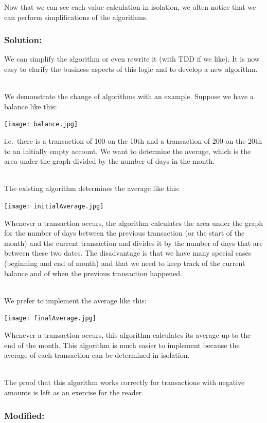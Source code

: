\documentclass[a4paper,fleqn,titlepage,11pt]{article}
\begin{document}
Now that we can see each value calculation in isolation, we often notice that we can perform simplifications of the algorithms. 

\subsubsection*{Solution:}

We can simplify the algorithm or even rewrite it (with TDD if we like). It is now easy to clarify the business aspects of this logic and to develop a new algorithm. 
\\~

We demonstrate the change of algorithms with an example.
Suppose we have a balance like this:

\texttt{[image: balance.jpg]}

i.e.~there is a transaction of 100 on the 10th and a transaction of 200 on the 20th to an initially empty account.
We want to determine the average, which is the area under the graph divided by the number of days in the month.
\\~

The existing algorithm determines the average like this:

\texttt{[image: initialAverage.jpg]}

Whenever a transaction occurs, the algorithm calculates the area under the graph for the number of days between the previous transaction (or the start of the month) and the current transaction and divides it by the number of days that are between these two dates. The disadvantage is that we have many special cases (beginning and end of month) and that we need to keep track of the current balance and of when the previous transaction happened.
\\~

We prefer to implement the average like this:

\texttt{[image: finalAverage.jpg]}

Whenever a transaction occurs, this algorithm calculates its average up to the end of the month. This algorithm is much easier to implement because the average of each transaction can be determined in isolation.
\\~

The proof that this algorithm works correctly for transactions with negative amounts is left as an exercise for the reader.

\subsubsection*{Modified:}
\end{document}
